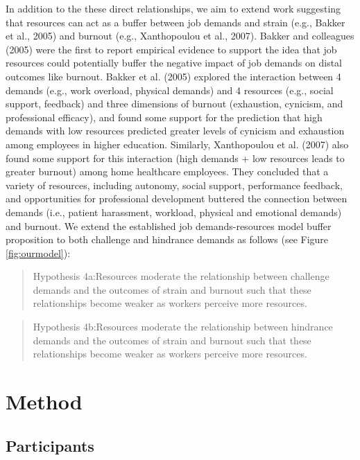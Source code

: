 \documentclass[
  man]{apa7}
\begin{document}
In addition to the these direct relationships, we aim to extend work suggesting that resources can act as a buffer between job demands and strain (e.g., Bakker et al., 2005) and burnout (e.g., Xanthopoulou et al., 2007). Bakker and colleagues (2005) were the first to report empirical evidence to support the idea that job resources could potentially buffer the negative impact of job demands on distal outcomes like burnout. Bakker et al. (2005) explored the interaction between 4 demands (e.g., work overload, physical demands) and 4 resources (e.g., social support, feedback) and three dimensions of burnout (exhaustion, cynicism, and professional efficacy), and found some support for the prediction that high demands with low resources predicted greater levels of cynicism and exhaustion among employees in higher education. Similarly, Xanthopoulou et al. (2007) also found some support for this interaction (high demands + low resources leads to greater burnout) among home healthcare employees. They concluded that a variety of resources, including autonomy, social support, performance feedback, and opportunities for professional development buttered the connection between demands (i.e., patient harassment, workload, physical and emotional demands) and burnout. We extend the established job demands-resources model buffer proposition to both challenge and hindrance demands as follows (see Figure \ref{fig:ourmodel}):

\begin{quote}
Hypothesis 4a:Resources moderate the relationship between challenge demands and the outcomes of strain and burnout such that these relationships become weaker as workers perceive more resources.
\end{quote}

\begin{quote}
Hypothesis 4b:Resources moderate the relationship between hindrance demands and the outcomes of strain and burnout such that these relationships become weaker as workers perceive more resources.
\end{quote}

\section{Method}\label{method}

\subsection{Participants}\label{participants}
\end{document}

